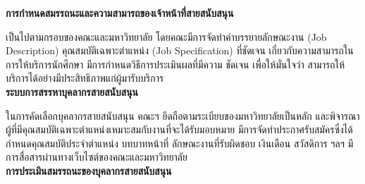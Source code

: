 \noindent\textbf{การกำหนดสมรรถนะและความสามารถของเจ้าหน้าที่สายสนับสนุน} 

เป็นไปตามกรอบของคณะและมหาวิทยาลัย  โดยคณะมีการจัดทำคำบรรยายลักษณะงาน  (Job Description) คุณสมบัติเฉพาะตำแหน่ง  (Job Specification)  ที่ชัดเจน เกี่ยวกับความสามารถในการให้บริการนักศึกษา มีการกำหนดวิธีการประเมินผลที่มีความ
ชัดเจน เพื่อให้มั่นใจว่า สามารถให้บริการได้อย่างมีประสิทธิภาพแก่ผู้มารับบริการ \\

\noindent\textbf{ระบบการสรรหาบุคลากรสายสนับสนุน}

ในการคัดเลือกบุคลากรสายสนับสนุน คณะฯ ยึดถือตามระเบียบของมหาวิทยาลัยเป็นหลัก และพิจารณาผู้ที่มีคุณสมบัติเฉพาะตำแหน่งเหมาะสมกับงานที่จะได้รับมอบหมาย มีการจัดทำประกาศรับสมัครซึ่งได้กำหนดคุณสมบัติประจำตำแหน่ง บทบาทหน้าที่ ลักษณะงานที่รับผิดชอบ เงินเดือน สวัสดิการ ฯลฯ มีการสื่อสารผ่านทางเว็บไซต์ของคณะและมหาวิทยาลัย\\

\noindent\textbf{การประเมินสมรรถนะของบุคลากรสายสนับสนุน}

